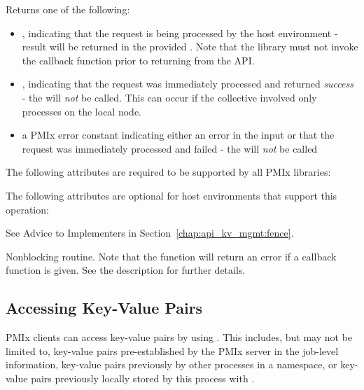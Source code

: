 Returns one of the following:

\begin{itemize}
    \item {}, indicating that the request is being processed by the host environment - result will be returned in the provided . Note that the library must not invoke the callback function prior to returning from the \ac{API}.
    \item {}, indicating that the request was immediately processed and returned \textit{success} - the  will \textit{not} be called. This can occur if the collective involved only processes on the local node.
    \item a PMIx error constant indicating either an error in the input or that the request was immediately processed and failed - the  will \textit{not} be called
\end{itemize}


\reqattrstart
The following attributes are required to be supported by all \ac{PMIx} libraries:


\reqattrend

\optattrstart
The following attributes are optional for host environments that support this operation:

See Advice to Implementers in Section~\ref{chap:api_kv_mgmt:fence}.
\pastePRIAttributeItemEnd
{}

\optattrend

\descr

Nonblocking  routine.
Note that the function will return an error if a  callback function is given.
See the  description for further details.


\subsection{Accessing Key-Value Pairs}
\label{chap:api_kv_mgmt:retrieve}

\ac{PMIx} clients can access key-value pairs by using .
This includes, but may not be limited to, key-value pairs pre-established by the \ac{PMIx} server in the job-level information, key-value pairs previously  by other processes in a namespace, or key-value pairs previously locally stored by this process with .

